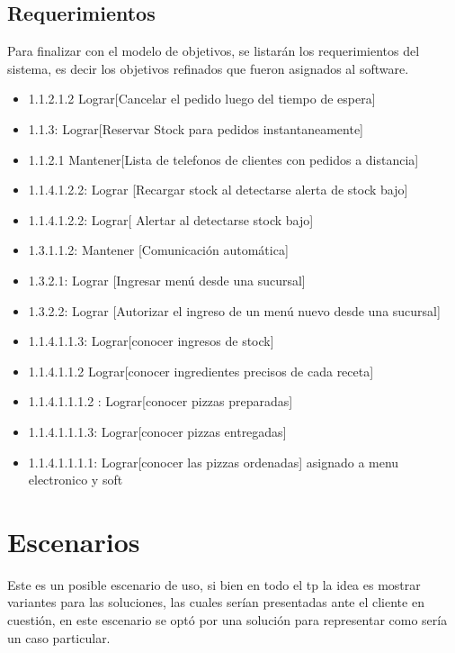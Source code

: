 \documentclass[a4paper,10pt]{article}
\begin{document}
\bigskip

\subsection*{Requerimientos}
Para finalizar con el modelo de objetivos, se listar\'an los requerimientos del sistema, es decir los objetivos refinados que fueron asignados al software.

\begin{itemize}
\item 1.1.2.1.2 Lograr[Cancelar el pedido luego del tiempo de espera]
\item 1.1.3: Lograr[Reservar Stock para pedidos instantaneamente]
\item 1.1.2.1 Mantener[Lista de telefonos de clientes con pedidos a distancia]
\item 1.1.4.1.2.2: Lograr [Recargar stock al detectarse alerta de stock bajo]
\item 1.1.4.1.2.2: Lograr[ Alertar al detectarse stock bajo]
\item 1.3.1.1.2: Mantener [Comunicación automática]
\item 1.3.2.1: Lograr [Ingresar menú desde una sucursal]
\item 1.3.2.2: Lograr [Autorizar el ingreso de un menú nuevo desde una sucursal]
\item 1.1.4.1.1.3: Lograr[conocer ingresos de stock]
\item 1.1.4.1.1.2 Lograr[conocer ingredientes precisos de cada receta]
\item 1.1.4.1.1.1.2 : Lograr[conocer pizzas preparadas]
\item 1.1.4.1.1.1.3: Lograr[conocer pizzas entregadas]	
\item 1.1.4.1.1.1.1:  Lograr[conocer las pizzas ordenadas] asignado a menu electronico y soft
\end{itemize}





\newpage
\section*{Escenarios}

Este es un posible escenario de uso, si bien en todo el tp la idea es mostrar variantes para las soluciones, las cuales ser\'ian presentadas 
ante el cliente en cuesti\'on, en este escenario se opt\'o por una soluci\'on para representar como ser\'ia un caso particular.
\end{document}
